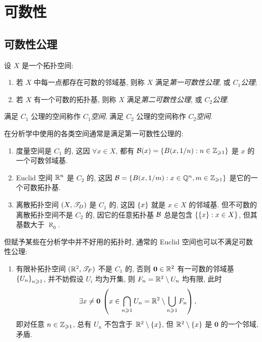
\section{可数性}

\subsection{可数性公理}

    \begin{Definition}[可数性公理]
        设 $ X $ 是一个拓扑空间:
        \begin{enumerate}
            \item 若 $ X $ 中每一点都存在可数的邻域基, 则称 $ X $ 满足\emph{第一可数性公理}, 或 $ C_1 $\emph{公理};
            \item 若 $ X $ 有一个可数的拓扑基, 则称 $ X $ 满足\emph{第二可数性公理}, 或 $ C_2 $\emph{公理}.
        \end{enumerate}
        满足 $ C_1 $ 公理的空间称作 $ C_1 $\emph{空间}, 满足 $ C_2 $ 公理的空间称作 $ C_2 $\emph{空间}.
    \end{Definition}

    \begin{Example}\label{ex:可数性例子}
        在分析学中使用的各类空间通常是满足第一可数性公理的:
        \begin{enumerate}
            \item 度量空间是 $ C_1 $ 的, 这因 $ \forall x\in X $, 都有 $ \mathcal{B}(x)=\left\{ B(x,1/n) : n\in\mathbb{Z}_{\geqslant 1} \right\} $ 是 $ x $ 的一个可数邻域基.
            \item Euclid 空间 $ \mathbb{R}^n $ 是 $ C_2 $ 的, 这因 $ \mathcal{B}=\left\{ B(x,1/m) : x\in\mathbb{Q}^n, m\in\mathbb{Z}_{\geqslant 1} \right\} $ 是它的一个可数拓扑基.
            \item 离散拓扑空间 $ (X,\mathscr{T}_D) $ 是 $ C_1 $ 的, 这因 $ \left\{ x \right\} $ 就是 $ x\in X $ 的邻域基. 但不可数的离散拓扑空间不是 $ C_2 $ 的, 因它的任意拓扑基 $ \mathcal{B} $ 总是包含 $ \left\{ \left\{ x \right\} : x\in X \right\} $, 但其基数大于 $ \aleph_0 $.
        \end{enumerate}
        但赋予某些在分析学中并不好用的拓扑时, 通常的 Euclid 空间也可以不满足可数性公理:
        \begin{enumerate}[start=4]
            \item 有限补拓扑空间 $ (\mathbb{R}^2,\mathscr{T}_F) $ 不是 $ C_1 $ 的, 否则 $ \mathbf{0}\in\mathbb{R}^2 $ 有一可数的邻域基 $ \left\{ U_n \right\}_{n\geqslant 1} $, 并不妨假设 $ U_i $ 均为开集, 则 $ F_n=\mathbb{R}^2\setminus U_n $ 均有限, 此时
            \[
                \exists x\ne\mathbf{0}\,\left( x\in\bigcap_{n\geqslant 1}U_n=\mathbb{R}^2\setminus\bigcup_{n\geqslant 1}F_n \right),
            \]
            即对任意 $ n\in\mathbb{Z}_{\geqslant 1} $, 总有 $ U_n $ 不包含于 $ \mathbb{R}^2\setminus\left\{ x \right\} $, 但 $ \mathbb{R}^2\setminus\left\{ x \right\} $ 是 $ \mathbf{0} $ 的一个邻域, 矛盾.
        \end{enumerate}
    \end{Example}

